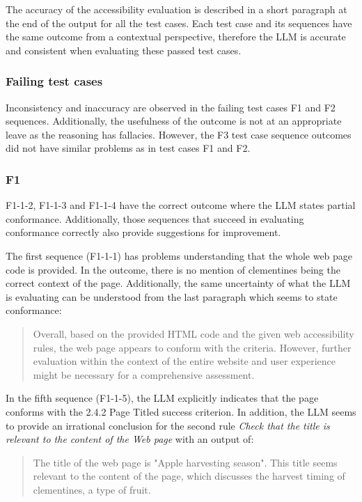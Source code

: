 The accuracy of the accessibility evaluation is described in a short paragraph at the end of the output for all the test cases. Each test case and its sequences have the same outcome from a contextual perspective, therefore the LLM is accurate and consistent when evaluating these passed test cases.

\subsubsection{Failing test cases}

Inconsistency and inaccuracy are observed in the failing test cases F1 and F2 sequences. Additionally, the usefulness of the outcome is not at an appropriate leave as the reasoning has fallacies. However, the F3 test case sequence outcomes did not have similar problems as in test cases F1 and F2.

\subsubsection{F1}

F1-1-2, F1-1-3 and F1-1-4 have the correct outcome where the LLM states partial conformance. Additionally, those sequences that succeed in evaluating conformance correctly also provide suggestions for improvement. 

The first sequence (F1-1-1) has problems understanding that the whole web page code is provided. In the outcome, there is no mention of clementines being the correct context of the page. Additionally, the same uncertainty of what the LLM is evaluating can be understood from the last paragraph which seems to state conformance:

\blockquote{Overall, based on the provided HTML code and the given web accessibility rules, the web page appears to conform with the criteria. However, further evaluation within the context of the entire website and user experience might be necessary for a comprehensive assessment.}

In the fifth sequence (F1-1-5), the LLM explicitly indicates that the page conforms with the 2.4.2 Page Titled success criterion. In addition, the LLM seems to provide an irrational conclusion for the second rule \textit{Check that the title is relevant to the content of the Web page} with an output of:

\blockquote{The title of the web page is "Apple harvesting season". This title seems relevant to the content of the page, which discusses the harvest timing of clementines, a type of fruit.}

